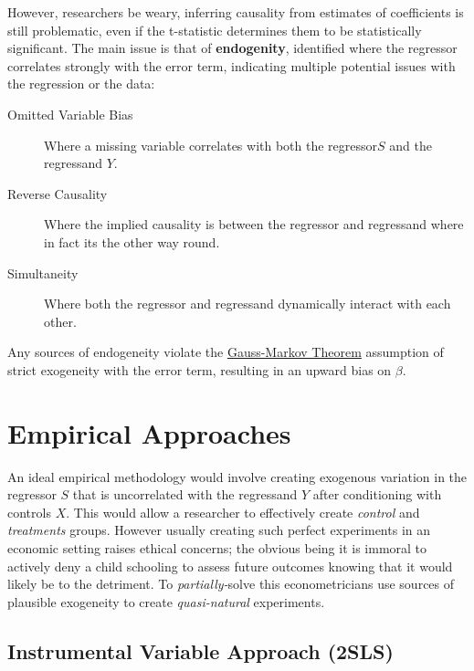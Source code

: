 \documentclass[../Main.tex]{subfiles}
\begin{document}
\begin{refsection}
However, researchers be weary, inferring causality from estimates of
coefficients is still problematic, even if the t-statistic determines them to be
statistically significant. The main issue is that of \textbf{endogenity},
identified where the regressor correlates strongly with the error term,
indicating multiple potential issues with the regression or the data: 
\begin{description}
    \item[Omitted Variable Bias] Where a missing variable correlates with both the regressor$S$ and the regressand $Y$. 
    \item[Reverse Causality] Where the implied causality is between the
    regressor and regressand where in fact its the other way round.
    \item[Simultaneity] Where both the regressor and regressand dynamically
    interact with each other. \end{description}

Any sources of endogeneity violate the
\href{https://en.wikipedia.org/wiki/Gauss%E2%80%93Markov_theorem#:~:text=the%20original%20equation.-,Strict%20exogeneity,-%5Bedit%5D}{Gauss-Markov Theorem} assumption of strict exogeneity with the error term, resulting in an
upward bias on $\beta$.

\vfill
     \vfill
\newpage
\section{Empirical Approaches}

An ideal empirical methodology would involve creating exogenous variation in the
regressor $S$ that is uncorrelated with the regressand $Y$ after conditioning
with controls $X$. This would allow a researcher to effectively create
\textit{control} and \textit{treatments} groups. However usually creating such
perfect experiments in an economic setting raises ethical concerns; the obvious
being it is immoral to actively deny a child schooling to assess future outcomes
knowing that it would likely be to the detriment. To \textit{partially-}solve
this econometricians use sources of plausible exogeneity to create
\textit{quasi-natural} experiments.

\subsection{Instrumental Variable Approach (2SLS)}


\end{refsection}
\end{document}
